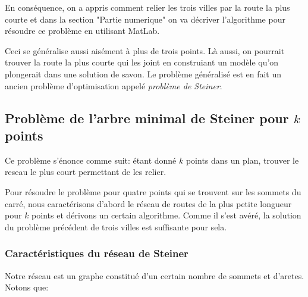 \documentclass[10pt,a4paper]{article}%
\theoremstyle{theorem}
\theoremstyle{definition}
\begin{document}
	        
	        En conséquence, on a appris comment relier les trois villes par la route la plus courte et dans la section "Partie numerique" on va décriver l'algorithme pour résoudre ce problème en utilisant MatLab. 
	        
	        Ceci se généralise aussi aisément à plus de trois points. Là aussi, on pourrait trouver la route la plus courte qui les joint en construiant un modèle qu'on plongerait dans une solution de savon. Le problème généralisé est en fait un ancien problème d'optimisation appelé \textit{problème de Steiner}.
	        
		\subsection{Problème de l'arbre minimal de Steiner pour $k$ points}
		
			Ce problème s'énonce comme suit: étant donné $k$ points dans un plan, trouver le reseau le plus court permettant de les relier.
			
			Pour résoudre le problème pour quatre points qui se trouvent sur les sommets du carré, nous caractérisons d'abord le réseau de routes de la plus petite longueur pour $k$ points et dérivons un certain algorithme. Comme il s'est avéré, la solution du problème précédent de trois villes est suffisante pour sela. 
			
			\subsubsection{Caractéristiques du réseau de Steiner}
			Notre réseau est un graphe constitué d'un certain nombre de sommets et d'aretes. Notons que:
			
\end{document}
